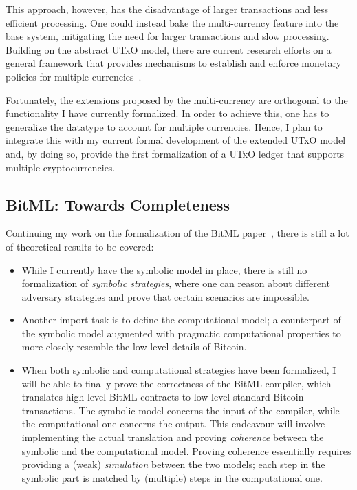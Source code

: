 \documentclass[acmsmall,nonacm=true,screen=true]{acmart}
\begin{document}
This approach, however, has the disadvantage of larger transactions and less efficient processing.
One could instead bake the multi-currency feature into the base system, mitigating the need for
larger transactions and slow processing.
Building on the abstract UTxO model, there are current research efforts on a general framework that provides mechanisms
to establish and enforce monetary policies for multiple currencies~\cite{multicurrency}.

Fortunately, the extensions proposed by the multi-currency are orthogonal to the functionality I have currently formalized.
In order to achieve this, one has to generalize the \inlineValue{} datatype to account for multiple currencies.
Hence, I plan to integrate this with my current formal development of the extended UTxO model and,
by doing so, provide the first formalization of a UTxO ledger that supports multiple cryptocurrencies.

\subsection{BitML: Towards Completeness}
Continuing my work on the formalization of the BitML paper~\cite{bitml},
there is still a lot of theoretical results to be covered:
\begin{itemize}
\item While I currently have the symbolic model in place, there is still no formalization of \textit{symbolic strategies},
where one can reason about different adversary strategies and prove that certain scenarios are impossible.
\item Another import task is to define the computational model; a counterpart of the symbolic model augmented
with pragmatic computational properties to more closely resemble the low-level details of Bitcoin.
\item When both symbolic and computational strategies have been formalized, I will be able to finally
prove the correctness of the BitML compiler, which translates high-level BitML contracts to
low-level standard Bitcoin transactions. The symbolic model concerns the input of the compiler, while
the computational one concerns the output.
This endeavour will involve implementing the actual translation and proving \textit{coherence} between the
symbolic and the computational model.
Proving coherence essentially requires providing a (weak) \textit{simulation} between the two models;
each step in the symbolic part is matched by (multiple) steps in the computational one.
\end{itemize}
\end{document}
